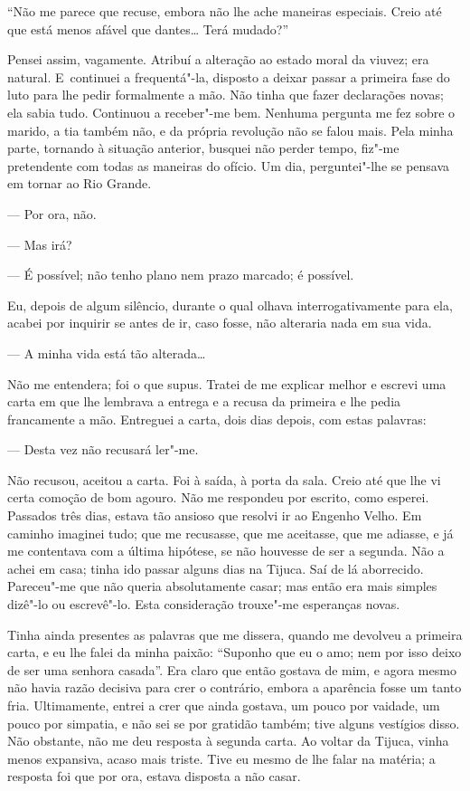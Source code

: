 \begin{linenumbers}
``Não me parece que recuse, embora não lhe ache maneiras especiais.
Creio até que está menos afável que dantes\ldots{} Terá mudado?''

Pensei assim, vagamente. Atribuí a alteração ao estado moral da viuvez;
era natural. E~continuei a frequentá"-la, disposto a deixar passar a
primeira fase do luto para lhe pedir formalmente a mão. Não tinha que
fazer declarações novas; ela sabia tudo. Continuou a receber"-me bem.
Nenhuma pergunta me fez sobre o marido, a tia também não, e da própria
revolução não se falou mais. Pela minha parte, tornando à situação
anterior, busquei não perder tempo, fiz"-me pretendente com todas as
maneiras do ofício. Um dia, perguntei"-lhe se pensava em tornar ao Rio
Grande.

--- Por ora, não.

--- Mas irá?

--- É possível; não tenho plano nem prazo marcado; é possível.

Eu, depois de algum silêncio, durante o qual olhava interrogativamente
para ela, acabei por inquirir se antes de ir, caso fosse, não alteraria
nada em sua vida.

--- A minha vida está tão alterada\ldots{}

Não me entendera; foi o que supus. Tratei de me explicar melhor e
escrevi uma carta em que lhe lembrava a entrega e a recusa da primeira e
lhe pedia francamente a mão. Entreguei a carta, dois dias depois, com
estas palavras:

--- Desta vez não recusará ler"-me.

Não recusou, aceitou a carta. Foi à saída, à porta da sala. Creio até
que lhe vi certa comoção de bom agouro. Não me respondeu por escrito,
como esperei. Passados três dias, estava tão ansioso que resolvi ir ao
Engenho Velho. Em caminho imaginei tudo; que me recusasse, que me
aceitasse, que me adiasse, e já me contentava com a última hipótese, se
não houvesse de ser a segunda. Não a achei em casa; tinha ido passar
alguns dias na Tijuca. Saí de lá aborrecido. Pareceu"-me que não queria
absolutamente casar; mas então era mais simples dizê"-lo ou escrevê"-lo.
Esta consideração trouxe"-me esperanças novas.

Tinha ainda presentes as palavras que me dissera, quando me devolveu a
primeira carta, e eu lhe falei da minha paixão: ``Suponho que eu o amo;
nem por isso deixo de ser uma senhora casada''. Era claro que então
gostava de mim, e agora mesmo não havia razão decisiva para crer o
contrário, embora a aparência fosse um tanto fria. Ultimamente, entrei a
crer que ainda gostava, um pouco por vaidade, um pouco por simpatia, e
não sei se por gratidão também; tive alguns vestígios disso. Não
obstante, não me deu resposta à segunda carta. Ao voltar da Tijuca,
vinha menos expansiva, acaso mais triste. Tive eu mesmo de lhe falar na
matéria; a resposta foi que por ora, estava disposta a não casar.


\end{linenumbers}
